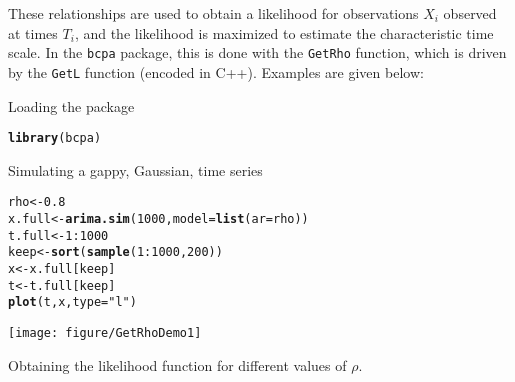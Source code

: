 \documentclass[10pt]{article}\usepackage[]{graphicx}\usepackage[]{color}
\makeatletter
\newcommand{\hlnum}[1]{\textcolor[rgb]{0.686,0.059,0.569}{#1}}%
\newcommand{\hlstr}[1]{\textcolor[rgb]{0.192,0.494,0.8}{#1}}%
\newcommand{\hlopt}[1]{\textcolor[rgb]{0,0,0}{#1}}%
\newcommand{\hlstd}[1]{\textcolor[rgb]{0.345,0.345,0.345}{#1}}%
\newcommand{\hlkwb}[1]{\textcolor[rgb]{0.69,0.353,0.396}{#1}}%
\newcommand{\hlkwc}[1]{\textcolor[rgb]{0.333,0.667,0.333}{#1}}%
\newcommand{\hlkwd}[1]{\textcolor[rgb]{0.737,0.353,0.396}{\textbf{#1}}}%
\newenvironment{kframe}{%
 \def\at@end@of@kframe{}%
 \ifinner\ifhmode%
  \def\at@end@of@kframe{\end{minipage}}%
  \begin{minipage}{\columnwidth}%
 \fi\fi%
 \def\FrameCommand##1{\hskip\@totalleftmargin \hskip-\fboxsep
 \colorbox{shadecolor}{##1}\hskip-\fboxsep
     \hskip-\linewidth \hskip-\@totalleftmargin \hskip\columnwidth}%
 \MakeFramed {\advance\hsize-\width
   \@totalleftmargin\z@ \linewidth\hsize
   \@setminipage}}%
 {\par\unskip\endMakeFramed%
 \at@end@of@kframe}
\newenvironment{knitrout}{}{} %
\makeatother
\begin{document}
These relationships are used to obtain a likelihood for observations $X_i$ observed at times $T_i$, and the likelihood is maximized to estimate the characteristic time scale. In the \texttt{bcpa} package, this is done with the \texttt{GetRho} function, which is driven by the \texttt{GetL} function (encoded in C++).  Examples are given below:

Loading the package
\begin{knitrout}
\color{fgcolor}\begin{kframe}
\begin{alltt}
\hlkwd{library}\hlstd{(bcpa)}
\end{alltt}
\end{kframe}
\end{knitrout}


Simulating a gappy, Gaussian, time series

\begin{knitrout}
\color{fgcolor}\begin{kframe}
\begin{alltt}
\hlstd{rho} \hlkwb{<-} \hlnum{0.8}
\hlstd{x.full} \hlkwb{<-} \hlkwd{arima.sim}\hlstd{(}\hlnum{1000}\hlstd{,} \hlkwc{model} \hlstd{=} \hlkwd{list}\hlstd{(}\hlkwc{ar} \hlstd{= rho))}
\hlstd{t.full} \hlkwb{<-} \hlnum{1}\hlopt{:}\hlnum{1000}
\hlstd{keep} \hlkwb{<-} \hlkwd{sort}\hlstd{(}\hlkwd{sample}\hlstd{(}\hlnum{1}\hlopt{:}\hlnum{1000}\hlstd{,} \hlnum{200}\hlstd{))}
\hlstd{x} \hlkwb{<-} \hlstd{x.full[keep]}
\hlstd{t} \hlkwb{<-} \hlstd{t.full[keep]}
\hlkwd{plot}\hlstd{(t, x,} \hlkwc{type} \hlstd{=} \hlstr{"l"}\hlstd{)}
\end{alltt}
\end{kframe}
\texttt{[image: figure/GetRhoDemo1]} 

\end{knitrout}


Obtaining the likelihood function for different values of $\rho$.
\end{document}
